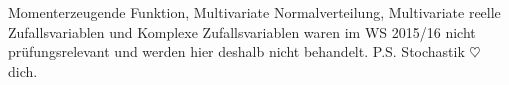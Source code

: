 \documentclass[german,color,6pt]{latex4ei/latex4ei_sheet}
\begin{document}
Momenterzeugende Funktion, Multivariate Normalverteilung, Multivariate reelle Zufallsvariablen und Komplexe Zufallsvariablen waren im WS 2015/16 nicht prüfungsrelevant und werden hier deshalb nicht behandelt.
P.S. Stochastik $\heartsuit$ dich.



\end{document}
